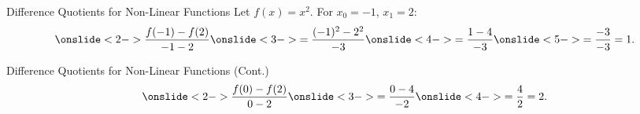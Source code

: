 \documentclass{beamer}
\theoremstyle{definition}
\begin{document}
\begin{frame}{Difference Quotients for Non-Linear Functions}
  Let $f(x) = x^2$. For $x_0 = -1$, $x_1 = 2$:
  $$\onslide<2->{\frac{f(-1) - f(2)}{-1 - 2}} \onslide<3->{= \frac{(-1)^2 - 2^2}{-3}} \onslide<4->{= \frac{1 - 4}{-3}} \onslide<5->{= \frac{-3}{-3} = 1.}$$
  \begin{center}
    \end{center}
\end{frame}

\begin{frame}{Difference Quotients for Non-Linear Functions (Cont.)}
  $$\onslide<2->{\frac{f(0) - f(2)}{0 - 2}} \onslide<3->{= \frac{0 - 4}{-2}} \onslide<4->{= \frac{4}{2} = 2.}$$
  \begin{center}
  \end{center}
\end{frame}
\end{document}

